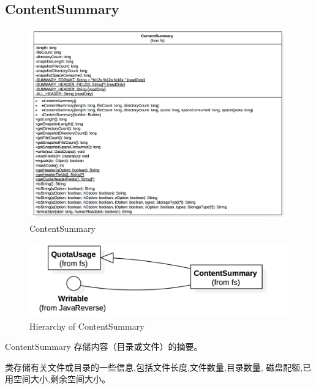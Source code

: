 \subsection{ContentSummary}

\begin{figure}
\centering
\includegraphics[width =1\linewidth]{uml/outputstream/9.png}
\caption{ContentSummary}
\label{fig:ContentSummary}
\end{figure}

\begin{figure}
\centering
\includegraphics[width =1\linewidth]{uml/outputstream/10.png}
\caption{Hierarchy of ContentSummary}
\label{fig:Hierarchy of ContentSummary}
\end{figure}

ContentSummary 存储内容（目录或文件）的摘要。

类存储有关文件或目录的一些信息,包括文件长度,文件数量,目录数量,
磁盘配额,已用空间大小,剩余空间大小。

